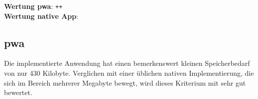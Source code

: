 \textbf{Wertung \ac{pwa}}: \texttt{++} \\
\textbf{Wertung native App}:  \\

\subsection{\ac{pwa}}
Die implementierte Anwendung hat einen bemerkenswert kleinen Speicherbedarf von  nur 430 Kilobyte. Verglichen mit einer üblichen nativen Implementierung, die sich im Bereich mehrerer Megabyte bewegt, wird dieses Kriterium mit sehr gut bewertet.